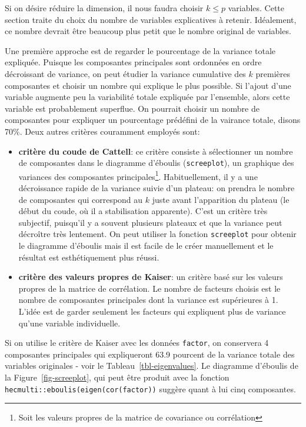 \documentclass[
  11pt,
  letterpaper,
]{scrbook}
\providecommand{\tightlist}{%
  \setlength{\itemsep}{0pt}\setlength{\parskip}{0pt}}\usepackage{longtable,booktabs,array}
\theoremstyle{definition}
\theoremstyle{remark}
\begin{document}
Si on désire réduire la dimension, il nous faudra choisir \(k \leq p\)
variables. Cette section traite du choix du nombre de variables
explicatives à retenir. Idéalement, ce nombre devrait être beaucoup plus
petit que le nombre original de variables.

Une première approche est de regarder le pourcentage de la variance
totale expliquée. Puisque les composantes principales sont ordonnées en
ordre décroissant de variance, on peut étudier la variance cumulative
des \(k\) premières composantes et choisir un nombre qui explique le
plus possible. Si l'ajout d'une variable augmente peu la variabilité
totale expliquée par l'ensemble, alors cette variable est probablement
superflue. On pourrait choisir un nombre de composantes pour expliquer
un pourcentage prédéfini de la vairance totale, disons 70\%. Deux autres
critères couramment employés sont:

\begin{itemize}
\tightlist
\item
  \textbf{critère du coude de Cattell}: ce critère consiste à
  sélectionner un nombre de composantes dans le diagramme d'éboulis
  (\texttt{screeplot}), un graphique des variances des composantes
  principales\footnote{Soit les valeurs propres de la matrice de
    covariance ou corrélation}. Habituellement, il y a une décroissance
  rapide de la variance suivie d'un plateau: on prendra le nombre de
  composantes qui correspond au \(k\) juste avant l'apparition du
  plateau (le début du coude, où il a stabilisation apparente). C'est un
  critère très subjectif, puisqu'il y a souvent plusieurs plateaux et
  que la variance peut décroître très lentement. On peut utiliser la
  fonction \texttt{screeplot} pour obtenir le diagramme d'éboulis mais
  il est facile de le créer manuellement et le résultat est
  esthétiquement plus réussi.
\item
  \textbf{critère des valeurs propres de Kaiser}: un critère basé sur
  les valeurs propres de la matrice de corrélation. Le nombre de
  facteurs choisis est le nombre de composantes principales dont la
  variance est supérieures à 1. L'idée est de garder seulement les
  facteurs qui expliquent plus de variance qu'une variable individuelle.
\end{itemize}

Si on utilise le critère de Kaiser avec les données \texttt{factor}, on
conservera 4 composantes principales qui expliqueront 63.9 pourcent de
la variance totale des variables originales - voir le
Tableau~\ref{tbl-eigenvalues}. Le diagramme d'éboulis de la
Figure~\ref{fig-screeplot}, qui peut être produit avec la fonction
\texttt{hecmulti::eboulis(eigen(cor(factor))} suggère quant à lui cinq
composantes.
\end{document}

